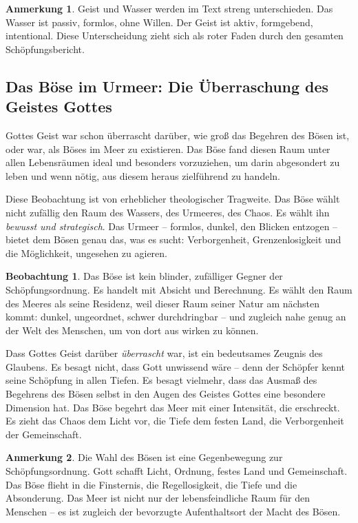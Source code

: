﻿\documentclass[a4paper,12pt]{article}
\theoremstyle{definition}
\newtheorem{remark}{Anmerkung}[section]
\newtheorem{observation}{Beobachtung}[section]
\begin{document}
\begin{remark}
    Geist und Wasser werden im Text streng unterschieden. Das Wasser ist passiv,
    formlos, ohne Willen. Der Geist ist aktiv, form\-gebend, intentional. Diese
    Unterscheidung zieht sich als roter Faden durch den gesamten Schöpfungsbericht.
\end{remark}

\subsection{Das Böse im Urmeer: Die Überraschung des Geistes Gottes}

Gottes Geist war schon überrascht darüber, wie groß das Begehren des Bösen ist,
oder war, als Böses im Meer zu existieren. Das Böse fand diesen Raum unter allen
Lebensräumen ideal und besonders vorzuziehen, um darin abgesondert zu leben und
wenn nötig, aus diesem heraus zielführend zu handeln.

Diese Beobachtung ist von erheblicher theologischer Tragweite. Das Böse wählt
nicht zufällig den Raum des Wassers, des Urmeeres, des Chaos. Es wählt ihn
\textit{bewusst und strategisch}. Das Urmeer -- formlos, dunkel, den Blicken
entzogen -- bietet dem Bösen genau das, was es sucht: Verborgenheit,
Grenzenlosigkeit und die Möglichkeit, ungesehen zu agieren.

\begin{observation}
    Das Böse ist kein blinder, zufälliger Gegner der Schöpfungsordnung. Es handelt
    mit Absicht und Berechnung. Es wählt den Raum des Meeres als seine Residenz,
    weil dieser Raum seiner Natur am nächsten kommt: dunkel, ungeordnet, schwer
    durchdringbar -- und zugleich nahe genug an der Welt des Menschen, um von dort
    aus wirken zu können.
\end{observation}

Dass Gottes Geist darüber \textit{überrascht} war, ist ein bedeutsames Zeugnis
des Glaubens. Es besagt nicht, dass Gott unwissend wäre -- denn der Schöpfer kennt
seine Schöpfung in allen Tiefen. Es besagt vielmehr, dass das Ausmaß des Begehrens
des Bösen selbst in den Augen des Geistes Gottes eine besondere Dimension hat.
Das Böse begehrt das Meer mit einer Intensität, die erschreckt. Es zieht das Chaos
dem Licht vor, die Tiefe dem festen Land, die Verborgenheit der Gemeinschaft.

\begin{remark}
    Die Wahl des Bösen ist eine Gegenbewegung zur Schöpfungsordnung. Gott schafft
    Licht, Ordnung, festes Land und Gemeinschaft. Das Böse flieht in die Finsternis,
    die Regellosigkeit, die Tiefe und die Absonderung. Das Meer ist nicht nur der
    lebensfeindliche Raum für den Menschen -- es ist zugleich der bevorzugte
    Aufenthaltsort der Macht des Bösen.
\end{remark}
\end{document}
